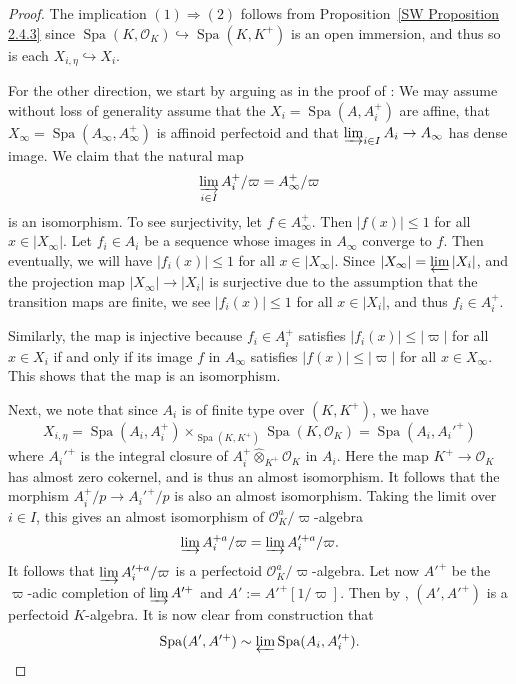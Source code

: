 \documentclass[10pt,oneside]{amsart}
\theoremstyle{definition}
\newcommand{\Spa}{\operatorname{Spa}}
\newcommand{\hotimes}{\hat{\otimes}}
\begin{document}
\begin{proof}
	The implication $(1)\Rightarrow (2)$ follows from Proposition~\ref{SW Proposition 2.4.3} since $\Spa(K,\mathcal O_K)\hookrightarrow \Spa(K,K^+)$ is an open immersion, and thus so is each $X_{i,\eta}\hookrightarrow X_i$.
	
	For the other direction, we start by arguing as in the proof of \cite[Proposition 2.4.5]{SW}: We may assume without loss of generality assume that the $X_i=\Spa(A,A_i^+)$ are affine, that $X_\infty=\Spa(A_\infty,A_\infty^+)$ is affinoid perfectoid and that $\varinjlim_{i\in I} A_i\to A_\infty$ has dense image. We claim that the natural map
	\[\varinjlim_{i\in I}A_i^+/\varpi= A_\infty^{+}/\varpi\]
	is an isomorphism. To see surjectivity, let $f\in A_\infty^+$. Then $|f(x)|\leq 1$ for all $x\in |X_\infty|$. Let $f_i\in A_i$ be a sequence whose images in $A_\infty$ converge to $f$. Then eventually, we will have $|f_i(x)|\leq 1$ for all  $x\in |X_\infty|$. Since $|X_\infty|=\varprojlim |X_i|$, and the projection map $|X_\infty|\to |X_i|$ is surjective due to the assumption that the transition maps are finite, we see $|f_i(x)|\leq 1$ for all $x\in |X_i|$, and thus $f_i\in A_i^+$.
	
	Similarly, the map is injective because $f_i\in A_i^+$ satisfies $|f_i(x)|\leq |\varpi|$ for all $x\in X_i$ if and only if its image $f$ in $A_\infty$ satisfies $|f(x)|\leq |\varpi|$ for all $x\in X_\infty$. This shows that the map is an isomorphism.
	
	
	Next, we note that since $A_i$ is of finite type over $(K,K^+)$, we have \[X_{i,\eta}=\Spa(A_i,A_i^+)\times_{\Spa(K,K^+)}\Spa(K,\mathcal O_K)=\Spa(A_i,A_i'^+)\]
	where $A_i'^+$ is the integral closure of $A_i^+\hotimes_{K^+}\mathcal O_K$ in $A_i$. Here the map $K^+\to \mathcal O_K$ has almost zero cokernel, and is thus an almost isomorphism. It follows that the morphism $A_i^+/p\to A_i'^+/p$ is also an almost isomorphism. Taking the limit over $i\in I$, this gives an almost isomorphism of $\mathcal O_K^a/\varpi$-algebra
	\[\varinjlim A_i^{+a}/\varpi=\varinjlim A'^{+a}_i/\varpi.\]
	It follows that $\varinjlim A'^{+a}_i/\varpi$ is a perfectoid $\mathcal O_K^a/\varpi$-algebra. Let now $A'^{+}$ be the $\varpi$-adic completion of $\varinjlim A'^+$ and $A':=A'^{+}[1/\varpi]$. Then by \cite[Theorem  5.2]{perfectoid}, $(A',A'^+)$ is a perfectoid $K$-algebra. It is now clear from construction that 
	\[\Spa(A',A'^+)\sim \varprojlim\Spa(A_i,A_i'^+).\qedhere\]
\end{proof}
\fi
		
\end{document}
